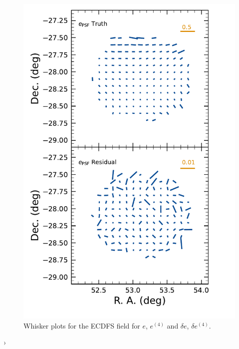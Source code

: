 \begin{figure}[htb!]
    \includegraphics[scale=0.33]{figures/performance/psf_second_whisker.pdf}
    \caption{\small Whisker plots for the  \gls{ECDFS} field for $e$, $e^{(4)}$ and $\delta e$, $\delta e^{(4)}$.}
    \label{fig:psf_residuals_whisker_ECDFS}
\end{figure}›

